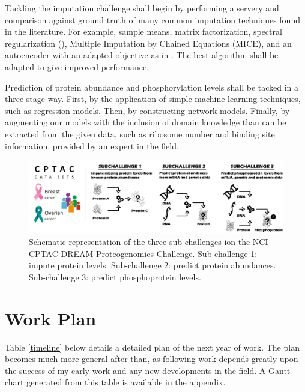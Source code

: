 \documentclass[
11pt, %
english, %
singlespacing, %
headsepline, %
]{MastersDoctoralThesis} %
\begin{document}
Tackling the imputation challenge shall begin by performing a servery and comparison against ground truth of many common imputation techniques found in the literature. For example, sample means, matrix factorization, spectral regularization (\cite{mazumder2010spectral}), Multiple Imputation by Chained Equations (MICE), and an autoencoder with an adapted objective as in \cite{beaulieu2016missing}. The best algorithm shall be adapted to give improved performance.

Prediction of protein abundance and phosphorylation levels shall be tacked in a three stage way. First, by the application of simple machine learning techniques, such as regression models. Then, by constructing network models. Finally, by augmenting our models with the inclusion of domain knowledge than can be extracted from the given data, such as ribosome number and binding site information, provided by an expert in the field. 

\begin{figure}
	\centering
	\includegraphics[width=\textwidth]{figures/DREAM}
	\caption[NCI-CPTAC DREAM Proteogenomics Challenge Sub-challenges]{Schematic representation of the three sub-challenges ion the NCI-CPTAC DREAM Proteogenomics Challenge. Sub-challenge 1: impute protein levels. Sub-challenge 2: predict protein abundances. Sub-challenge 3: predict phosphoprotein levels.}
\end{figure}



%
%


\chapter{Work Plan}

Table \cref{timeline} below details a detailed plan of the next year of work. The plan becomes much more general after than, as following work depends greatly upon the success of my early work and any new developments in the field. A Gantt chart generated from this table is available in the appendix.
\end{document}
